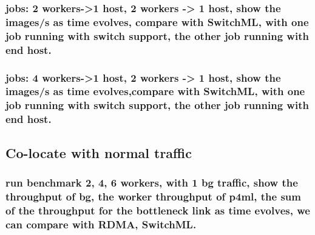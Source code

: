 \subsubsection{jobs: 2 workers->1 host, 2 workers -> 1 host, show the images/s as time evolves, compare with SwitchML, with one job running with switch support, the other job running with end host.}
\subsubsection{jobs: 4 workers->1 host, 2 workers -> 1 host, show the images/s as time evolves,compare with SwitchML, with one job running with switch support, the other job running with end host. }


\subsection{Co-locate with normal traffic}
\subsubsection{run benchmark 2, 4, 6 workers, with 1 bg traffic, show the throughput of bg, the worker throughput of p4ml, the sum of the throughput for the bottleneck link as time evolves, we can compare with RDMA, SwitchML.}